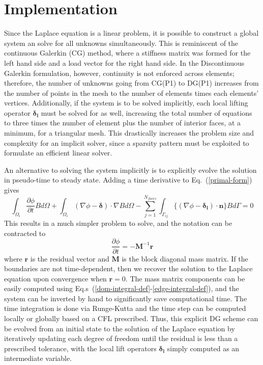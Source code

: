 \documentclass[a4paper]{article}
\newcommand{\eref}[1]{Eq.~(\ref{#1})}
\newcommand{\erefs}[2]{Eq.s~(\ref{#1}-\ref{#2})}
\newcommand{\dint}[1]{\int_{\Omega_i}{#1 d\Omega}}
\newcommand{\sint}[1]{\int_{\Gamma_{ij}}{#1 d\Gamma}}
\newcommand{\average}[1]{\ensuremath{\{#1\}} }
\newcommand{\glift}{\boldsymbol{\delta}}
\newcommand{\llift}{\boldsymbol{\delta_l}}
\newcommand{\unitn}{\mathbf{n}}
\newcommand{\mm}{\mathbf{M}}
\newcommand{\vr}{\mathbf{r}}
\begin{document}
\section{Implementation}
Since the Laplace equation is a linear problem, it is possible to construct a
global system an solve for all unknowns simultaneously.  This is reminiscent of
the continuous Galerkin (CG) method, where a stiffness matrix was formed for the left
hand side and a load vector for the right hand side.  In the Discontinuous Galerkin
formulation, however, continuity is not enforced across elements; therefore, the
number of unknowns going from CG(P1) to DG(P1) increases from the number of
points in the mesh to the number of elements times each elements' vertices.
Additionally, if the system is to be solved implicitly, each local lifting
operator $\llift$ must be solved for as well, increasing the total number of
equations to three times the number of element plus the number of interior
faces, at a minimum, for a triangular mesh.  This drastically increases the
problem size and complexity for an implicit solver, since a sparsity pattern
must be exploited to formulate an efficient linear solver.

An alternative to solving the system implicitly is to explicitly evolve the
solution in pseudo-time to steady state.  Adding a time derivative to
\eref{primal-form} gives
\begin{equation}
  \dint{\frac{\partial \phi}{\partial t}B} +
  \dint{(\nabla \phi - \glift)\cdot \nabla B} -
  \sum_{j=1}^{N_{faces}}\sint{\average{(\nabla \phi - \llift)\cdot\unitn}B} = 0
  \label{primal-w-time}
\end{equation}
This results in a much simpler problem to solve, and the notation can be
contracted to
\begin{equation}
  \frac{\partial \phi}{\partial t} = -\mm^{-1} \vr
  \label{simple-explicit}
\end{equation}
where $\vr$ is the residual vector and $\mm$ is the block diagonal mass matrix.
If the boundaries are not time-dependent, then we recover the solution to the
Laplace equation upon convergence when $\vr= 0$.  The mass matrix components can be
easily computed using \erefs{dom-integral-def}{edge-integral-def}, and the
system can be inverted by hand to significantly save computational time. The time
integration is done via Runge-Kutta and the time step can be computed locally or
globally based on a CFL prescribed.  Thus, this explicit DG scheme can be
evolved from an initial state to the solution of the Laplace equation by
iteratively updating each degree of freedom until the residual is less than a
prescribed tolerance, with the local lift operators $\llift$ simply computed as
an intermediate variable.
\end{document}
